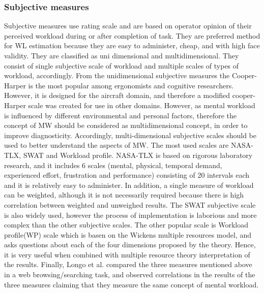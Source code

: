 \documentclass[a4paper]{report}
\begin{document}
				\subsubsection{Subjective measures}
				Subjective measures use rating scale and are based on operator opinion of their perceived workload during or after completion of task. They are preferred method for WL estimation because they are easy to administer, cheap, and with high face validity. They are classified as uni dimensional and multidimensional. They consist of single subjective scale of workload and multiple scales of types of workload, accordingly. From the unidimensional subjective measures the Cooper-Harper\cite{cooper1969use} is the most popular among ergonomists and cognitive researchers. However, it is designed for the aircraft domain, and therefore a modified cooper-Harper scale\cite{wierwille1983validated} was created for use in other domains. However, as mental workload is influenced by different environmental and personal factors\cite{rouse1993modeling}, therefore the concept of MW should be considered as multidimensional concept, in order to improve diagnosticity. Accordingly, multi-dimensional subjective scales should be used to better understand the aspects of MW. The most used scales are NASA-TLX\cite{nasatlx}, SWAT\cite{reid1988subjective} and Workload profile\cite{tsang1996diagnosticity}. NASA-TLX is based on rigorous laboratory research, and it includes 6 scales (mental, physical, temporal demand, experienced effort, frustration and performance) consisting of 20 intervals each and it is relatively easy to administer. In addition, a single measure of workload can be weighted, although it is not necessarily required because there is high correlation between weighted and unweighed results\cite{byers1988workload}. 
				The SWAT subjective scale is also widely used, however the process of implementation is laborious and more complex than the other subjective scales. The other popular scale is Workload profile(WP)\cite{tsang1996diagnosticity} scale which is basen on the Wickens multiple resources model, and asks questions about each of the four dimensions proposed by the theory. Hence, it is very useful when combined with multiple resource theory interpretation of the results. Finally, Longo et al. \cite{longo2012importance} compared the three measures mentioned above in a web browsing/searching task, and observed correlations in the results of the three measures claiming that they measure the same concept of mental workload.\\
\end{document}
